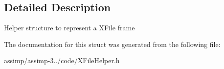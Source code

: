 \subsection{Detailed Description}
Helper structure to represent a X\+File frame 

The documentation for this struct was generated from the following file\+:\begin{DoxyCompactItemize}
\item 
assimp/assimp-\/3../code/X\+File\+Helper.\+h\end{DoxyCompactItemize}
